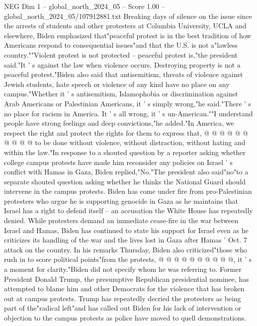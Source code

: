 \begin{textsample}{NEG Dim 1 – global\_north\_2024\_05 – Score 1.00 – global\_north\_2024\_05/107912881.txt}  \label{ex:f1_neg_049}
Breaking days of silence on the issue since the arrests of students and other protesters at Columbia University, UCLA and elsewhere, Biden emphasized that"peaceful protest is in the best tradition of how Americans respond to consequential issues"and that the U.S. is not a"lawless country.""Violent protest is not protected -- peaceful protest is,"the president said."It ' s against the law when violence occurs.
Destroying property is not a peaceful protest."Biden also said that antisemitism, threats of violence against Jewish students, hate speech or violence of any kind have no place on any campus."Whether it ' s antisemitism, Islamophobia or discrimination against Arab Americans or Palestinian Americans, it ' s simply wrong,"he said."There ' s no place for racism in America.
It ' s all wrong, it ' s un-American.""I understand people have strong feelings and deep convictions,"he added."In America, we respect the right and protect the rights for them to express that, @ @ @ @ @ @ @ @ @ @ to be done without violence, without distraction, without hating and within the law."In response to a shouted question by a reporter asking whether college campus protests have made him reconsider any policies on Israel ' s conflict with Hamas in Gaza, Biden replied,"No."The president also said"no"to a separate shouted question asking whether he thinks the National Guard should intervene in the campus protests.
Biden has come under fire from pro-Palestinian protesters who argue he is supporting genocide in Gaza as he maintains that Israel has a right to defend itself -- an accusation the White House has repeatedly denied.
While protesters demand an immediate cease-fire in the war between Israel and Hamas, Biden has continued to state his support for Israel even as he criticizes its handling of the war and the lives lost in Gaza after Hamas ' Oct. 7 attack on the country.
In his remarks Thursday, Biden also criticized"those who rush in to score political points"from the protests, @ @ @ @ @ @ @ @ @ @, it ' s a moment for clarity."Biden did not specify whom he was referring to.
Former President Donald Trump, the presumptive Republican presidential nominee, has attempted to blame him and other Democrats for the violence that has broken out at campus protests.
Trump has repeatedly decried the protesters as being part of the"radical left"and has called out Biden for his lack of intervention or objection to the campus protests as police have moved to quell demonstrations.

\end{textsample}
